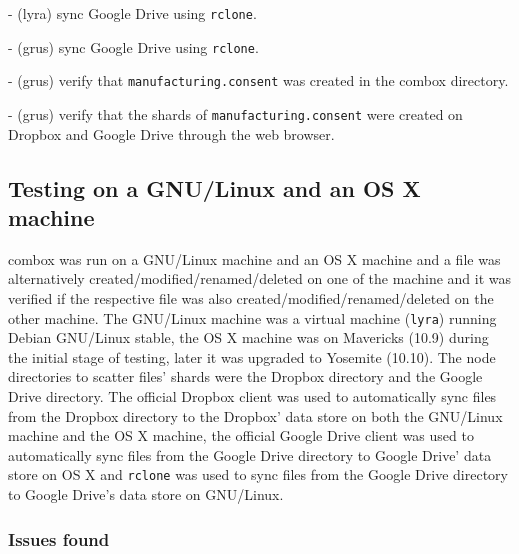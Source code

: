 - (lyra) sync Google Drive using \verb+rclone+.

- (grus) sync Google Drive using \verb+rclone+.

- (grus) verify that \verb+manufacturing.consent+ was created in the
combox directory.

- (grus) verify that the shards of \verb+manufacturing.consent+ were
created on Dropbox and Google Drive through the web browser.

\subsection{Testing on a GNU/Linux and an OS X machine}

combox was run on a GNU/Linux machine and an OS X machine and a file
was alternatively created/modified/renamed/deleted on one of the
machine and it was verified if the respective file was also
created/modified/renamed/deleted on the other machine. The GNU/Linux
machine was a virtual machine (\verb+lyra+) running Debian GNU/Linux
stable, the OS X machine was on Mavericks (10.9) during the initial
stage of testing, later it was upgraded to Yosemite (10.10). The node
directories to scatter files' shards were the Dropbox directory and
the Google Drive directory. The official Dropbox client was used to
automatically sync files from the Dropbox directory to the Dropbox'
data store on both the GNU/Linux machine and the OS X machine, the
official Google Drive client was used to automatically sync files from
the Google Drive directory to Google Drive' data store on OS X and
\verb+rclone+ \cite{program:rclone} was used to sync files from the
Google Drive directory to Google Drive's data store on GNU/Linux.

\subsubsection{Issues found}

